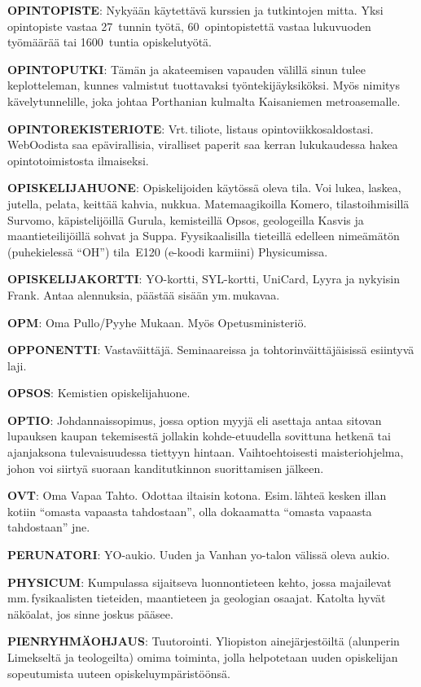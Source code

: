 \documentclass[../ala_hataile.tex]{subfiles}
\begin{document}
\textbf{OPINTOPISTE}: Nykyään käytettävä
kurssien ja tutkintojen mitta. Yksi opintopiste
vastaa 27~tunnin työtä, 60~opintopistettä
vastaa lukuvuoden työmäärää tai 1600~tuntia opiskelutyötä.

\textbf{OPINTOPUTKI}: Tämän ja akateemisen
vapauden välillä sinun tulee keplotteleman,
kunnes valmistut tuottavaksi työntekijäyksiköksi.
Myös nimitys kävelytunnelille,
joka johtaa Porthanian kulmalta Kaisaniemen
metroasemalle.

\textbf{OPINTOREKISTERIOTE}: Vrt.\,tiliote,
listaus opintoviikkosaldostasi. WebOodista
saa epävirallisia, viralliset paperit saa kerran
lukukaudessa hakea opintotoimistosta
ilmaiseksi.

\textbf{OPISKELIJAHUONE}: Opiskelijoiden
käytössä oleva tila. Voi lukea,
laskea, jutella, pelata, keittää kahvia, nukkua.
Matemaagikoilla Komero, tilasto\-ihmisillä Survomo, käpistelijöillä
Gurula, kemisteillä Opsos, geologeilla
Kasvis ja maantieteilijöillä sohvat ja Suppa. Fyysikaalisilla tieteillä edelleen
nimeämätön (puhekielessä ``OH'') tila~E120 (e-koodi karmiini) Physicumissa.

\textbf{OPISKELIJAKORTTI}: YO-kortti,
SYL-kortti, UniCard, Lyyra ja nykyisin
Frank. Antaa alennuksia, päästää sisään
ym.\,mukavaa.

\textbf{OPM}: Oma Pullo/Pyyhe Mukaan. Myös
Opetusministeriö.

\textbf{OPPONENTTI}: Vastaväittäjä. Seminaareissa
ja tohtorinväittäjäisissä esiintyvä laji.

\textbf{OPSOS}: Kemistien opiskelijahuone.

\textbf{OPTIO}: Johdannaissopimus, jossa option myyjä eli asettaja antaa sitovan lupauksen kaupan tekemisestä jollakin kohde-etuudella sovittuna hetkenä tai ajanjaksona tulevaisuudessa tiettyyn hintaan. Vaihtoehtoisesti maisteriohjelma, johon voi siirtyä suoraan kanditutkinnon suorittamisen jälkeen.

\textbf{OVT}: Oma Vapaa Tahto. Odottaa iltaisin kotona.
Esim.\,lähteä kesken illan kotiin ``omasta
vapaasta tahdostaan'', olla dokaamatta
``omasta vapaasta tahdostaan'' jne.

\textbf{PERUNATORI}: YO-aukio. Uuden ja
Vanhan yo-talon välissä oleva aukio.

\textbf{PHYSICUM}: Kumpulassa sijaitseva
luonnontieteen kehto, jossa majailevat mm.\,fysikaalisten tieteiden, maantieteen ja geologian
osaajat. Katolta hyvät näköalat, jos
sinne joskus pääsee.

\textbf{PIENRYHMÄOHJAUS}: Tuutorointi.
Yliopiston ainejärjestöiltä (alunperin Limekseltä
ja teologeilta) omima toiminta,
jolla helpotetaan uuden opiskelijan sopeutumista
uuteen opiskeluympäristöönsä.
\end{document}
